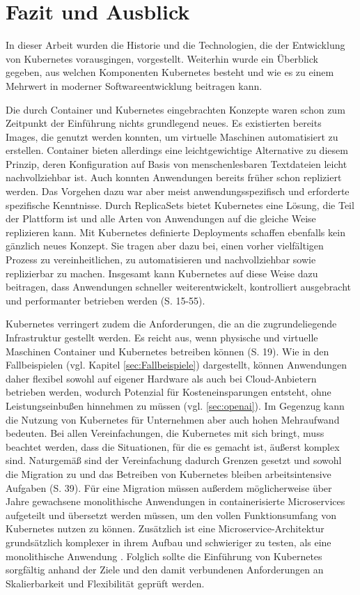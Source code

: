 \documentclass[11pt,a4paper]{article}
\begin{document}
\section{Fazit und Ausblick}
In dieser Arbeit wurden die Historie und die Technologien, die der Entwicklung von Kubernetes
vorausgingen, vorgestellt. Weiterhin wurde ein Überblick gegeben, aus welchen Komponenten
Kubernetes besteht und wie es zu einem Mehrwert in moderner Softwareentwicklung
beitragen kann.

Die durch Container und Kubernetes eingebrachten Konzepte waren schon zum Zeitpunkt der Einführung
nichts grundlegend neues.
Es existierten bereits Images, die genutzt werden konnten, um virtuelle Maschinen automatisiert
zu erstellen. Container bieten allerdings eine leichtgewichtige Alternative zu diesem Prinzip,
deren Konfiguration auf Basis von menschenlesbaren Textdateien leicht nachvollziehbar ist.
Auch konnten Anwendungen bereits früher schon repliziert werden.
Das Vorgehen dazu war aber meist anwendungsspezifisch und erforderte spezifische Kenntnisse.
Durch ReplicaSets bietet Kubernetes eine Lösung, die Teil der Plattform ist
und alle Arten von Anwendungen auf die gleiche Weise replizieren kann.
Mit Kubernetes definierte Deployments schaffen ebenfalls kein gänzlich neues Konzept.
Sie tragen aber dazu bei, einen vorher vielfältigen Prozess zu vereinheitlichen,
zu automatisieren und nachvollziehbar sowie replizierbar zu machen.
Insgesamt kann Kubernetes auf diese Weise dazu beitragen, dass
Anwendungen schneller weiterentwickelt, kontrolliert ausgebracht und
performanter betrieben werden \cite{Schmeling_Dargatz_2022} (S. 15-55).

Kubernetes verringert zudem die Anforderungen, die an die zugrundeliegende
Infrastruktur gestellt werden. Es reicht aus, wenn physische und virtuelle Maschinen
Container und Kubernetes betreiben können \cite{cicd_with_kubernetes_devops} (S. 19).
Wie in den Fallbeispielen (vgl. Kapitel \ref{sec:Fallbeispiele}) dargestellt, können Anwendungen daher
flexibel sowohl auf eigener Hardware als auch bei Cloud-Anbietern betrieben werden,
wodurch Potenzial für Kosteneinsparungen entsteht, ohne Leistungseinbußen
hinnehmen zu müssen (vgl. \ref{sec:openai}).
Im Gegenzug kann die Nutzung von Kubernetes für Unternehmen aber auch
hohen Mehraufwand bedeuten.
Bei allen Vereinfachungen, die Kubernetes mit sich bringt, muss beachtet werden,
dass die Situationen, für die es gemacht ist, äußerst komplex sind.
Naturgemäß sind der Vereinfachung dadurch Grenzen gesetzt und
sowohl die Migration zu und das Betreiben von Kubernetes bleiben
arbeitsintensive Aufgaben \cite{domingus2022cloud} (S. 39).
Für eine Migration müssen außerdem möglicherweise über Jahre gewachsene monolithische
Anwendungen in containerisierte Microservices aufgeteilt und übersetzt werden müssen,
um den vollen Funktionsumfang von Kubernetes nutzen zu können.
Zusätzlich ist eine Microservice-Architektur grundsätzlich komplexer
in ihrem Aufbau und schwieriger zu testen, als eine monolithische Anwendung \cite{8406008}.
Folglich sollte die Einführung von Kubernetes sorgfältig anhand der Ziele
und den damit verbundenen Anforderungen an Skalierbarkeit und Flexibilität
geprüft werden.
\end{document}
